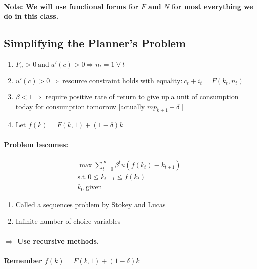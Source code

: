 \documentclass{article}
\begin{document}
\paragraph{Note: We will use functional forms for $F$ and $N$ for most everything we do in this class.}

\subsection{Simplifying the Planner's Problem}
\begin{enumerate}
    \item $F_n > 0\ \text{and}\ u'(c) > 0 \Rightarrow n_t = 1\ \forall \ t$
    \item $ u'(c) > 0 \Rightarrow \ \text{resource constraint holds with equality:}\ c_t + i_t = F(k_t,n_t)$
    \item $ \beta < 1 \Rightarrow$ require positive rate of return to give up a unit of consumption today for 
    consumption tomorrow [actually  $mp_{k+1}-\delta$ ]
    \item Let $f(k) = F(k,1) + (1-\delta)k$
\end{enumerate}

\paragraph{Problem becomes:}
\[
    \begin{aligned}
        \max_{} \sum_{t=0}^\infty \beta^t u(f(k_t) - k_{t+1})\\
        \text{s.t.}\ 
        0 \leq k_{t+1} \leq f(k_t)\\
        k_0 \text{ given}
    \end{aligned}
\]

\begin{enumerate}
    \item Called a sequences problem by Stokey and Lucas
    \item Infinite number of choice variables
\end{enumerate}

\paragraph{$\Rightarrow$ Use recursive methods.}
\paragraph{Remember $f(k) = F(k,1) + (1-\delta)k$}
\end{document}
